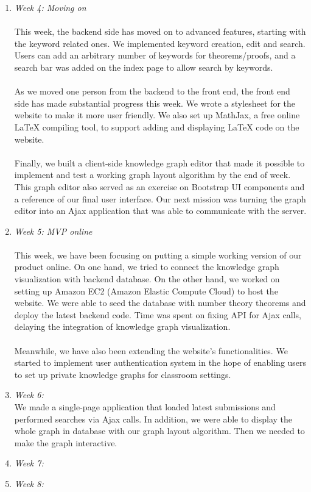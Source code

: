 \documentclass{acm_proc_article-sp}
\begin{document}
\begin{enumerate}
\item \emph{Week 4: Moving on}\\\\
This week, the backend side has moved on to advanced features, starting with the keyword related ones. We implemented keyword creation, edit and search. Users can add an arbitrary number of keywords for theorems/proofs, and a search bar was added on the index page to allow search by keywords.\\\\
As we moved one person from the backend to the front end, the front end side has made substantial progress this week. We wrote a stylesheet for the website to make it more user friendly. We also set up MathJax, a free online LaTeX compiling tool, to support adding and displaying LaTeX code on the website.\\\\
Finally, we built a client-side knowledge graph editor that made it possible to implement and test a working graph layout algorithm by the end of week. This graph editor also served as an exercise on Bootstrap UI components and a reference of our final user interface.
Our next mission was turning the graph editor into an Ajax application that was able to communicate with the server.
\\

\item \emph{Week 5:  MVP online}\\\\
This week, we have been focusing on putting a simple working version of our product online. On one hand, we tried to connect the knowledge graph visualization with backend database. On the other hand, we worked on setting up Amazon EC2 (Amazon Elastic Compute Cloud) to host the website. We were able to seed the database with number theory theorems and deploy the latest backend code. 
Time was spent on fixing API for Ajax calls, delaying the integration of knowledge graph visualization. \\\\
Meanwhile, we have also been extending the website's functionalities. We started to implement user authentication system in the hope of enabling users to set up private knowledge graphs for classroom settings.
\\

\item \emph{Week 6: }\\

We made a single-page application that loaded latest submissions and performed searches via Ajax calls. In addition, we were able to display the whole graph in database with our graph layout algorithm. Then we needed to make the graph interactive.

\item \emph{Week 7:  }\\



\item \emph{Week 8: }\\

\end{enumerate}
\end{document}
